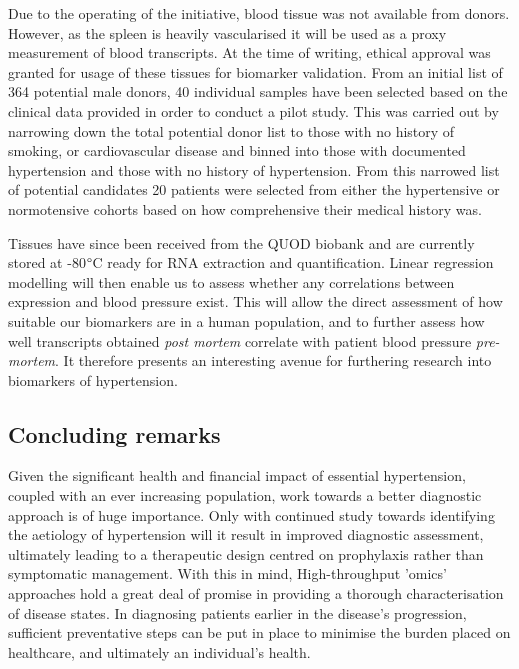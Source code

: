 Due to the operating of the initiative, blood tissue was not available from donors. However, as the spleen is heavily vascularised it will be used as a proxy measurement of blood transcripts. At the time of writing, ethical approval was granted for usage of these tissues for biomarker validation. From an initial list of 364 potential male donors, 40 individual samples have been selected based on the clinical data provided in order to conduct a pilot study. This was carried out by narrowing down the total potential donor list to those with no history of smoking, or cardiovascular disease and binned into those with documented hypertension and those with no history of hypertension. From this narrowed list of potential candidates 20 patients were selected from either the hypertensive or normotensive cohorts based on how comprehensive their medical history was. 

Tissues have since been received from the QUOD biobank and are currently stored at -80$\degree$C ready for RNA extraction and quantification. Linear regression modelling will then enable us to assess whether any correlations between expression and blood pressure exist. This will allow the direct assessment of how suitable our biomarkers are in a human population, and to further assess how well transcripts obtained \textit{post mortem} correlate with patient blood pressure \textit{pre-mortem}. It therefore presents an interesting avenue for furthering research into biomarkers of hypertension. 

\subsection{Concluding remarks}

Given the significant health and financial impact of essential hypertension, coupled with an ever increasing population, work towards a better diagnostic approach is of huge importance. Only with continued study towards identifying the aetiology of hypertension will it result in improved diagnostic assessment, ultimately leading to a therapeutic design centred on prophylaxis rather than symptomatic management. With this in mind, High-throughput 'omics' approaches hold a great deal of promise in providing a thorough characterisation of disease states. In diagnosing patients earlier in the disease’s progression, sufficient preventative steps can be put in place to minimise the burden placed on healthcare, and ultimately an individual’s health.